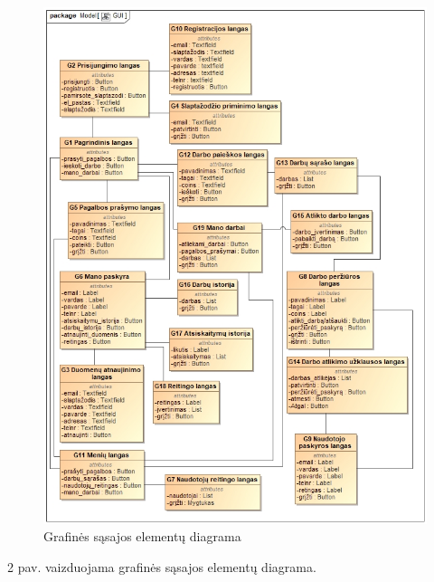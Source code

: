 \documentclass{VUMIFPSbakalaurinis}
\begin{document}
\begin{figure}[H]
	\centering
	\includegraphics[scale=0.7]{img/GUI}
	\caption{Grafinės sąsajos elementų diagrama}
	\label{img:gui}
\end{figure}
2 pav. vaizduojama grafinės sąsajos elementų diagrama. 
\end{document}
